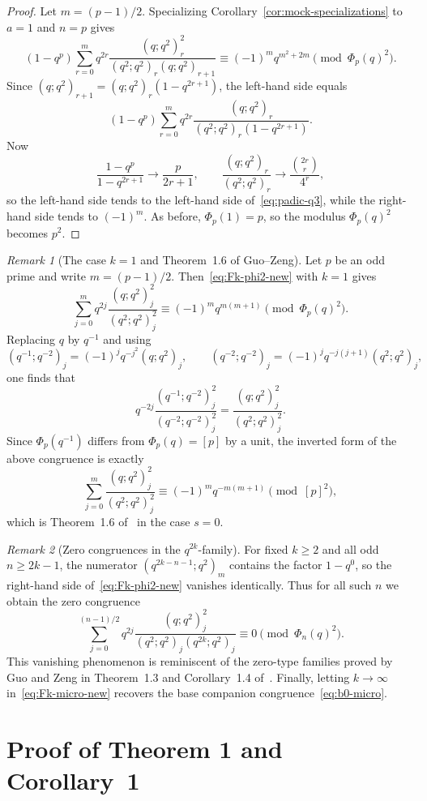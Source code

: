 \documentclass[reqno]{amsart}
\theoremstyle{definition}
\theoremstyle{plain}
\theoremstyle{remark}
\newtheorem{remark}{Remark}
\numberwithin{equation}{section}
\begin{document}
\begin{proof}
Let $m=(p-1)/2$. Specializing Corollary~\ref{cor:mock-specializations} to $a=1$ and $n=p$ gives
\[
(1-q^p)\sum_{r=0}^{m} q^{2r}\frac{(q;q^2)_r^2}{(q^2;q^2)_r(q;q^2)_{r+1}}
\equiv (-1)^m q^{m^2+2m}
\pmod{\Phi_p(q)^2}.
\]
Since $(q;q^2)_{r+1}=(q;q^2)_r(1-q^{2r+1})$, the left-hand side equals
\[
(1-q^p)\sum_{r=0}^{m} q^{2r}\frac{(q;q^2)_r}{(q^2;q^2)_r(1-q^{2r+1})}.
\]
Now
\[
\frac{1-q^p}{1-q^{2r+1}}\to \frac{p}{2r+1},
\qquad
\frac{(q;q^2)_r}{(q^2;q^2)_r}\to \frac{\binom{2r}{r}}{4^r},
\]
so the left-hand side tends to the left-hand side of~\eqref{eq:padic-q3}, while the right-hand side tends to $(-1)^m$. As before, $\Phi_p(1)=p$, so the modulus $\Phi_p(q)^2$ becomes $p^2$.
\end{proof}

\begin{remark}[The case $k=1$ and Theorem~1.6 of Guo--Zeng]\label{rem:k1-gz}
Let $p$ be an odd prime and write $m=(p-1)/2$. Then~\eqref{eq:Fk-phi2-new} with $k=1$ gives
\[
\sum_{j=0}^{m} q^{2j}\frac{(q;q^2)_j^2}{(q^2;q^2)_j^2}
\equiv (-1)^m q^{m(m+1)}
\pmod{\Phi_p(q)^2}.
\]
Replacing $q$ by $q^{-1}$ and using
\[
(q^{-1};q^{-2})_j=(-1)^j q^{-j^2}(q;q^2)_j,
\qquad
(q^{-2};q^{-2})_j=(-1)^j q^{-j(j+1)}(q^2;q^2)_j,
\]
one finds that
\[
q^{-2j}\frac{(q^{-1};q^{-2})_j^2}{(q^{-2};q^{-2})_j^2}
=
\frac{(q;q^2)_j^2}{(q^2;q^2)_j^2}.
\]
Since $\Phi_p(q^{-1})$ differs from $\Phi_p(q)=[p]$ by a unit, the inverted form of the above congruence is exactly
\[
\sum_{j=0}^{m}\frac{(q;q^2)_j^2}{(q^2;q^2)_j^2}
\equiv (-1)^m q^{-m(m+1)}
\pmod{[p]^2},
\]
which is Theorem~1.6 of~\cite{guo-zeng} in the case $s=0$.
\end{remark}

\begin{remark}[Zero congruences in the $q^{2k}$-family]\label{rem:zero-family}
For fixed $k\ge 2$ and all odd $n\ge 2k-1$, the numerator $(q^{2k-n-1};q^2)_m$ contains the factor $1-q^0$, so the right-hand side of~\eqref{eq:Fk-phi2-new} vanishes identically. Thus for all such $n$ we obtain the zero congruence
\[
\sum_{j=0}^{(n-1)/2} q^{2j}\frac{(q;q^2)_j^2}{(q^2;q^2)_j(q^{2k};q^2)_j}
\equiv 0 \pmod{\Phi_n(q)^2}.
\]
This vanishing phenomenon is reminiscent of the zero-type families proved by Guo and Zeng in Theorem~1.3 and Corollary~1.4 of~\cite{guo-zeng}. Finally, letting $k\to\infty$ in~\eqref{eq:Fk-micro-new} recovers the base companion congruence~\eqref{eq:b0-micro}.
\end{remark}

\section{Proof of Theorem 1 and Corollary~1}\label{sec:proof-phi}
\end{document}
